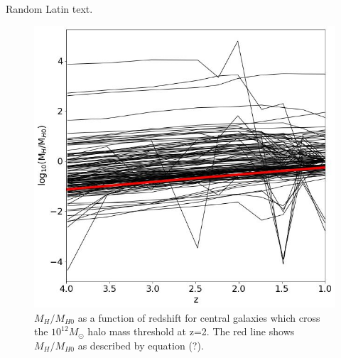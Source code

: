 \documentclass[12pt, twocolumn]{revtex4}    %
\begin{document}
Random Latin text.

\onecolumngrid


\begin{figure}[H]
\centering
\includegraphics[width=\linewidth]{Plot_5.jpeg}
\caption{$M_H/M_{H0}$ as a function of redshift for central galaxies which cross the $10^{12}M_\odot$ halo mass threshold at z=2. The red line shows $M_H/M_{H0}$ as described by equation (?).}
\label{fig:7}
\end{figure}
\twocolumngrid


\onecolumngrid
\end{document}
